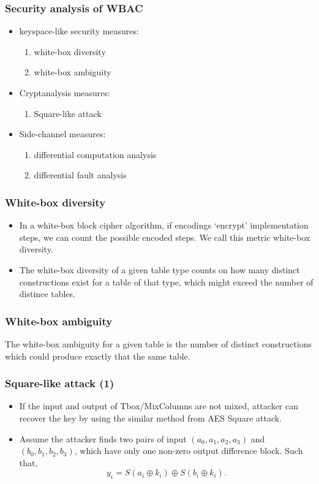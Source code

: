 \documentclass{beamer}
\begin{document}
\frame
{
\frametitle{Security analysis of WBAC}
\begin{itemize}
\item keyspace-like security measures:
    \begin{enumerate}
    \item white-box diversity
    \item white-box ambiguity
    \end{enumerate}

\item Cryptanalysis measures:
    \begin{enumerate}
    \item Square-like attack

    \end{enumerate}

\item Side-channel measures:
    \begin{enumerate}
    \item differential computation analysis
    \item differential fault analysis
    \end{enumerate}

\end{itemize}

}

\frame
{
\frametitle{White-box diversity}
\begin{itemize}
\item In a white-box block cipher algorithm, if encodings `encrypt' implementation steps, we can count the possible encoded steps. We call this metric \textcolor[rgb]{1.00,0.00,0.00}{white-box diversity}.

\item The white-box diversity of a given table type counts on how many distinct constructions exist for a table of that type, which might exceed the number of distince tables.

\end{itemize}
}

\frame
{
\frametitle{White-box ambiguity}
The \textcolor[rgb]{1.00,0.00,0.00}{white-box ambiguity} for a given table is the number of distinct constructions which could produce exactly that the same table.
}

\frame
{
\frametitle{Square-like attack (1)}
\begin{itemize}
\item If the input and output of Tbox/MixColumns are not mixed, attacker can recover the key by using the similar method from AES Square attack.

\item Assume the attacker finds two pairs of input $(a_{0}, a_{1}, a_{2}, a_{3})$ and $(b_{0}, b_{1}, b_{2}, b_{3})$, which have only one non-zero output difference block. Such that,
    \[y_{i} = S(a_{i} \oplus k_{i}) \oplus S(b_{i} \oplus k_{i}).\]

\end{itemize}
}
\end{document}
